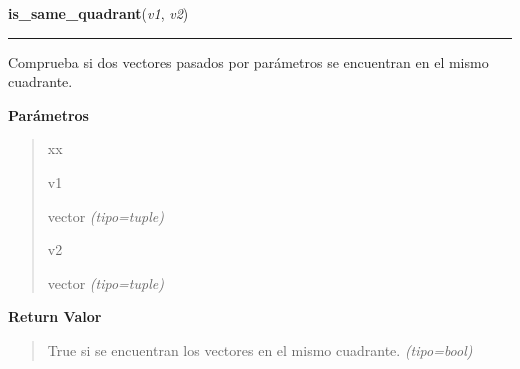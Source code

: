 \hspace{.8\funcindent}\begin{boxedminipage}{\funcwidth}

    \raggedright \textbf{is\_same\_quadrant}(\textit{v1}, \textit{v2})

    \vspace{-1.5ex}

    \rule{\textwidth}{0.5\fboxrule}
\setlength{\parskip}{2ex}
Comprueba si dos vectores pasados por parámetros se encuentran en el mismo cuadrante.

\setlength{\parskip}{1ex}
      \textbf{Parámetros}
      \vspace{-1ex}

      \begin{quote}
        \begin{Ventry}{xx}

          \item[v1]


vector
            {\it (tipo=tuple)}

          \item[v2]


vector
            {\it (tipo=tuple)}

        \end{Ventry}

      \end{quote}

      \textbf{Return Valor}
    \vspace{-1ex}

      \begin{quote}

True si se encuentran los vectores en el mismo cuadrante.
      {\it (tipo=bool)}

      \end{quote}

    \end{boxedminipage}

    \label{src:check_goban_moved:degress_between_two_vectors}

    \vspace{0.5ex}

